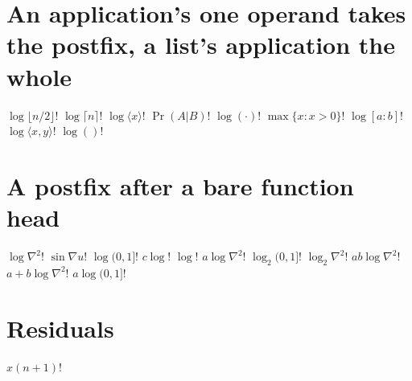 \documentclass{article}
\begin{document}
\section{An application's one operand takes the postfix, a list's application the whole}
$\log\lfloor n/2\rfloor!$ $\log\lceil n\rceil!$ $\log\langle x\rangle!$ $\Pr(A|B)!$ $\log(\cdot)!$
$\max\{x:x>0\}!$ $\log[a:b]!$ $\log\langle x,y\rangle!$ $\log()!$

\section{A postfix after a bare function head}
$\log\nabla^{2}!$ $\sin\nabla u!$ $\log(0,1]!$ $c\log!$ $\log!$ $a\log\nabla^{2}!$ $\log_{2}(0,1]!$ $\log_{2}\nabla^{2}!$ $ab\log\nabla^{2}!$ $a+b\log\nabla^{2}!$ $a\log(0,1]!$

\section{Residuals}
$x(n+1)!$
\end{document}
